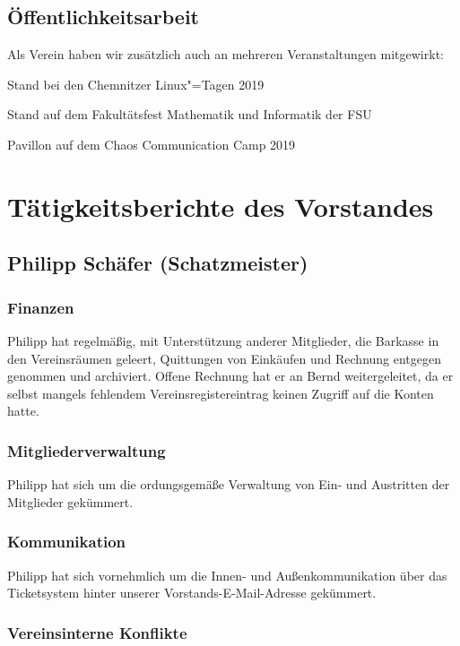 \documentclass[ngerman]{scrartcl}
\begin{document}
\subsection{Öffentlichkeitsarbeit}
Als Verein haben wir zusätzlich auch an mehreren Veranstaltungen mitgewirkt:
\begin{compactitem}
	\item Stand bei den Chemnitzer Linux"=Tagen 2019
	\item Stand auf dem Fakultätsfest Mathematik und Informatik der FSU
	\item Pavillon auf dem Chaos Communication Camp 2019
\end{compactitem}


\section{Tätigkeitsberichte des Vorstandes}

\subsection{Philipp Schäfer (Schatzmeister)}

\subsubsection{Finanzen}

Philipp hat regelmäßig, mit Unterstützung anderer Mitglieder, die Barkasse in
den Vereinsräumen geleert, Quittungen von Einkäufen und Rechnung entgegen
genommen und archiviert. Offene Rechnung hat er an Bernd weitergeleitet, da
er selbst mangels fehlendem Vereinsregistereintrag keinen Zugriff auf die Konten
hatte.

\subsubsection{Mitgliederverwaltung}

Philipp hat sich um die ordungsgemäße Verwaltung von Ein- und Austritten der
Mitglieder gekümmert.

\subsubsection{Kommunikation}

Philipp hat sich vornehmlich um die Innen- und Außenkommunikation über das
Ticketsystem hinter unserer Vorstands-E-Mail-Adresse gekümmert.

\subsubsection{Vereinsinterne Konflikte}
\end{document}
